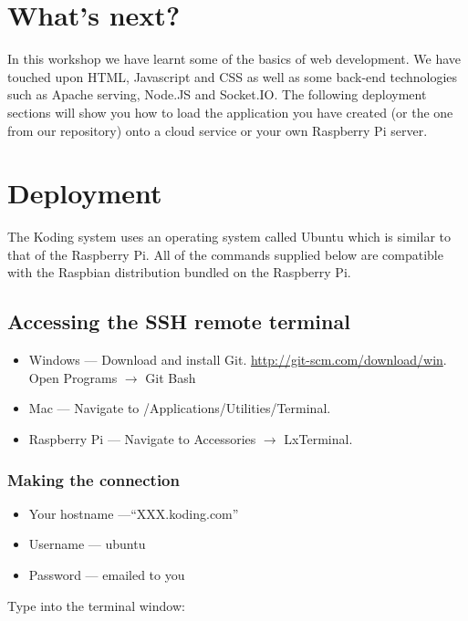 \documentclass[twocolumn]{article}
\begin{document}
\section{What's next?}

In this workshop we have learnt some of the basics of web development. We have touched upon HTML, Javascript and CSS as well as some back-end technologies such as Apache serving, Node.JS and Socket.IO. The following deployment sections will show you how to load the application you have created (or the one from our repository) onto a cloud service or your own Raspberry Pi server.

\section{Deployment}

The Koding system uses an operating system called Ubuntu which is similar to that of the Raspberry Pi. All of the commands supplied below are compatible with the Raspbian distribution bundled on the Raspberry Pi. 

\subsection{Accessing the SSH remote terminal}
\label{sec:terminal}

\begin{itemize}
\item Windows --- Download and install Git. \url{http://git-scm.com/download/win}. Open Programs $\rightarrow$ Git Bash
\item Mac --- Navigate to /Applications/Utilities/Terminal.
\item Raspberry Pi --- Navigate to Accessories $\rightarrow$ LxTerminal.
\end{itemize}

\subsubsection{Making the connection}
\label{sec:MakingTheConnection}

\begin{itemize}
\item Your hostname ---``XXX.koding.com'' 
\item Username --- ubuntu
\item Password --- emailed to you
\end{itemize}

Type into the terminal window:
\end{document}
